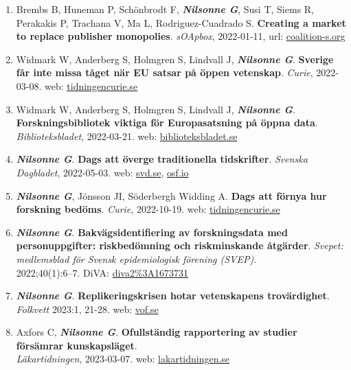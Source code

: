 \documentclass[10pt]{article}
\begin{document}
\begin{enumerate}[nolistsep]
\item Brembs B, Huneman P, Schönbrodt F, \textbf{\textit{Nilsonne G}}, Susi T, Siems R, Perakakis P, Trachana V, Ma L, Rodriguez-Cuadrado S. \textbf{Creating a market to replace publisher monopolies}. \emph{sOApbox}, 2022-01-11, url: \href{https://www.coalition-s.org/blog/creating-a-market-to-replace-publisher-monopolies/}{coalition-s.org}
\item Widmark W, Anderberg S, Holmgren S, Lindvall J, \textbf{\textit{Nilsonne G}}. \textbf{Sverige får inte missa tåget när EU satsar på öppen vetenskap}. \emph{Curie}, 2022-03-08. web: \href{https://www.tidningencurie.se/debatt/sverige-far-inte-missa-taget-nar-eu-satsar-pa-oppen-vetenskap/}{tidningencurie.se}
\item Widmark W, Anderberg S, Holmgren S, Lindvall J,  \textbf{\textit{Nilsonne G}}. \textbf{Forskningsbibliotek viktiga för Europasatsning på öppna data}. \emph{Biblioteksbladet}, 2022-03-21. web: \href{https://www.biblioteksbladet.se/ideer/debatt/forskningsbibliotek-viktiga-for-europasatsning-pa-oppen-data/}{biblioteksbladet.se}
\item \textbf{\textit{Nilsonne G}}. \textbf{Dags att överge traditionella tidskrifter}. \emph{Svenska Dagbladet}, 2022-05-03. web: \href{https://www.svd.se/a/eEr1JK/gustav-nilsonne-dags-att-overge-traditionella-tidskrifter}{svd.se}, \href{https://osf.io/8t2cz/}{osf.io}
\item \textbf{\textit{Nilsonne G}}, Jönsson JI, Söderbergh Widding A. \textbf{Dags att förnya hur forskning bedöms}. \emph{Curie}, 2022-10-19. web: \href{https://www.tidningencurie.se/debatt/dags-att-fornya-hur-forskning-bedoms}{tidningencurie.se}
\item \textbf{\textit{Nilsonne G}}. \textbf{Bakvägsidentifiering av forskningsdata med personuppgifter: riskbedömning och riskminskande åtgärder}. \emph{Svepet: medlemsblad för Svensk epidemiologisk förening (SVEP)}. \\
2022;40(1):6–7. DiVA: \href{http://www.diva-portal.org/smash/record.jsf?pid=diva2\%3A1673731}{diva2\%3A1673731}
\item \textbf{\textit{Nilsonne G}}. \textbf{Replikeringskrisen hotar vetenskapens trovärdighet}. \emph{Folkvett} 2023:1, 21-28. web: \href{https://www.vof.se/wp-content/uploads/2023/05/3-replikeringskrisen.pdf}{vof.se}
\item Axfors C, \textbf{\textit{Nilsonne G}}. \textbf{Ofullständig rapportering av studier försämrar kunskapsläget}.\\ \emph{Läkartidningen}, 2023-03-07. web: \href{https://lakartidningen.se/opinion/debatt/2023/03/ofullstandig-rapportering-av-studier-forsamrar-kunskapslaget}{lakartidningen.se}

\end{enumerate}
\end{document}
